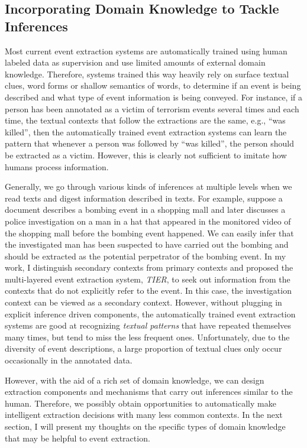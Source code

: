 \subsection{Incorporating Domain Knowledge to Tackle Inferences}
Most current event extraction systems are  
automatically trained using human labeled data as supervision 
and use limited 
amounts of external 
domain knowledge.
Therefore, systems trained this way heavily rely on surface textual clues, 
word forms or shallow semantics of words, to 
determine if an event is being described and what type of event information 
is being conveyed. 
For instance, if a person has been annotated as a 
victim of terrorism events several times and each time, the textual contexts 
that follow the extractions are the same, e.g., ``was killed'', 
then the automatically trained event extraction systems 
can learn the pattern that whenever a person was followed by 
``was killed'', the person 
should be extracted as a victim.  
However, this 
is clearly not sufficient to 
imitate how humans process information.

Generally, we go through various kinds of inferences at multiple levels 
when we read texts and digest information described in texts.
For example, 
suppose a document describes a bombing event 
in a shopping mall and later discusses a police investigation on a 
man in a hat that appeared in the monitored video of the shopping mall 
before the bombing event happened.  
We can easily infer that the investigated man has 
been suspected to have carried out the bombing and 
should be extracted as the potential perpetrator of the bombing event. 
In my work, I distinguish secondary contexts from 
primary contexts and proposed the multi-layered event extraction system, 
{\it TIER}, to seek out information from the contexts that do not 
explicitly refer to 
the event. In this case, the investigation context 
can be viewed as a secondary context. 
However, without plugging in explicit inference driven components, 
the automatically trained event extraction systems are good at 
recognizing {\it textual patterns} that have repeated themselves 
many times, but tend to miss the less frequent ones. 
Unfortunately, due to the diversity of event descriptions, 
a large proportion of textual clues only  
occur occasionally in the annotated data.  

However, with the aid of a rich set of domain knowledge, 
we can design extraction components and mechanisms 
that carry out inferences similar to the human. 
Therefore, we possibly obtain opportunities to 
automatically make intelligent extraction decisions 
with many less common
contexts. 
In the next section, I will present my thoughts 
on the specific types of domain knowledge that may 
be helpful to event extraction. 




